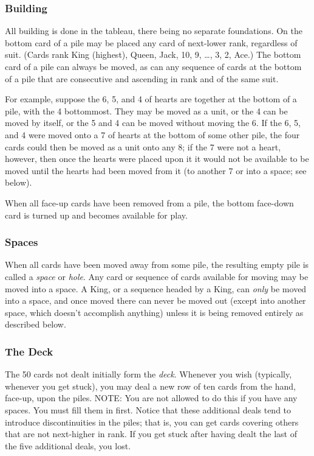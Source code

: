 \subsubsection*{Building}
All building is done in the tableau, there being no separate
foundations.  On the bottom card of a pile may be placed any card of
next-lower rank, regardless of suit.  (Cards rank King (highest), Queen,
Jack, 10, 9, \ldots, 3, 2, Ace.)  The bottom card of a pile
can always be moved, as can any sequence of cards at the bottom of a pile
that are consecutive and ascending in rank and of the same suit.

For example, suppose the 6, 5, and 4 of hearts are together at the bottom of
a pile, with the 4 bottommost.  They may be moved as a unit, or the 4 can be
moved by itself, or the 5 and 4 can be moved without moving the 6.  If the 6,
5, and 4 were moved onto a 7 of hearts at the bottom of some other pile, the
four cards could then be moved as a unit onto any 8; if the 7 were not a
heart, however, then once the hearts were placed upon it it would not be
available to be moved until the hearts had been moved from it (to another 7
or into a space; see below).

When all face-up cards have been removed from a pile, the bottom face-down
card is turned up and becomes available for play.

\subsubsection*{Spaces}
When all cards have been moved away from some pile, the resulting
empty pile is called a {\em space} or {\em hole}.
Any card or sequence of cards available for moving may be moved into a space.
A King, or a sequence headed by a King, can {\em only} be moved into a space,
and once moved there can never be moved out (except into another space, which
doesn't accomplish anything) unless it is being removed entirely as described
below.

\subsubsection*{The Deck}
The 50 cards not dealt initially form the {\em deck}.  Whenever you
wish (typically, whenever you get stuck), you may deal a new row of ten cards
from the hand, face-up, upon the piles.  NOTE: You are not allowed to do this
if you have any spaces.  You must fill them in first.  Notice that these
additional deals tend to introduce discontinuities in the piles; that is, you
can get cards covering others that are not next-higher in rank.  If you get
stuck after having dealt the last of the five additional deals, you
lost.


